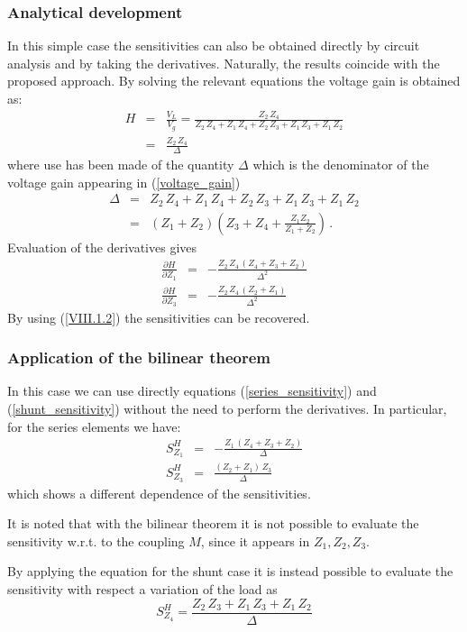 \documentclass[journal]{IEEEtran}
\newcommand{\bea}{\begin{eqnarray}}
\newcommand{\eea}{\end{eqnarray}}
\begin{document}
\subsubsection{Analytical development}
In this simple case the sensitivities can also be obtained directly by circuit analysis and by taking the derivatives. Naturally, the results coincide with the proposed approach. By solving the relevant equations the voltage gain is obtained as:
\bea
H & = & \frac{V_L}{V_g} =
\frac{{Z}_{2}\,{Z}_{4}}{{Z}_{2}\,{Z}_{4}+{Z}_{1}\,{Z}_{4}+{Z}_{2}\,{Z}_{3}+{Z}_{1}\,{Z}_{3}+{Z}_{1}\,{Z}_{2}} \nonumber \\
& = & 
\frac{{Z}_{2}\,{Z}_{4}}{\Delta}
\label{voltage_gain}
\eea
%
where use has been made of the quantity $\Delta$ which is the denominator of the voltage gain appearing in (\ref{voltage_gain})
%
\bea
\Delta & = & {{Z}_{2}\,{Z}_{4}+{Z}_{1}\,{Z}_{4}+{Z}_{2}\,{Z}_{3}+{Z}_{1}\,{Z}_{3}+{Z}_{1}\,{Z}_{2}} \nonumber \\
 & = & \left(Z_1+Z_2\right) \left(Z_3 + Z_4 + \frac{Z_1 Z_2}{Z_1+Z_2}  \right)\, .
\eea
%
Evaluation of the derivatives gives
%
\bea
\frac{\partial H}{\partial Z_1}  & = &
-\frac{{Z}_{2}\,{Z}_{4}\,\left( {Z}_{4}+{Z}_{3}+{Z}_{2}\right) }{\Delta^{2}}
 \nonumber \\
 \frac{\partial H}{\partial Z_3}  & = &
-\frac{{Z}_{2}\,{Z}_{4}\,\left( {Z}_{2}+{Z}_{1}\right) }{\Delta^{2}}
\eea
%
By using (\ref{VIII.1.2}) the sensitivities can be recovered.

\subsubsection{Application of the bilinear theorem}
In this case we can use directly equations (\ref{series_sensitivity}) and (\ref{shunt_sensitivity}) without the need to perform the derivatives.
In particular, for the series elements we have:
%
\begin{eqnarray}
S_{Z_1}^H  & = & 
-\frac{{Z}_{1}\,\left( {Z}_{4}+{Z}_{3}+{Z}_{2}\right) }{\Delta}
\nonumber \\
S_{Z_3}^H  & = & 
\frac{\left( {Z}_{2}+{Z}_{1}\right) \,{Z}_{3}}{\Delta}
\end{eqnarray}
%
which shows a different dependence of the sensitivities.

It is noted that with the bilinear theorem it is not possible to evaluate the sensitivity w.r.t. to the coupling $M$, since it appears in $Z_1,Z_2, Z_3$.

By applying the equation for the shunt case it is instead possible to evaluate the sensitivity with respect a variation of the load as
%
\begin{equation}
S^H_{Z_{4}} =  
\frac{{Z}_{2}\,{Z}_{3}+{Z}_{1}\,{Z}_{3}+{Z}_{1}\,{Z}_{2}}{\Delta}
\end{equation}
\end{document}
